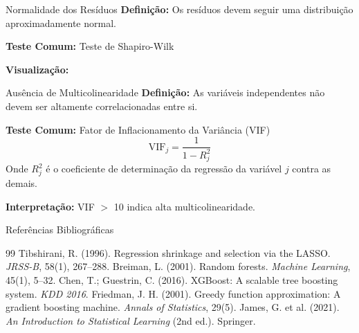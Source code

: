 \documentclass[]{beamer}
\begin{document}
\begin{frame}{Normalidade dos Resíduos}
    \textbf{Definição:}
    Os resíduos devem seguir uma distribuição aproximadamente normal.

    \vspace{0.5cm}
    \textbf{Teste Comum:} Teste de Shapiro-Wilk

    \vspace{0.5cm}
    \textbf{Visualização:}
\end{frame}


\begin{frame}{Ausência de Multicolinearidade}
    \textbf{Definição:}
    As variáveis independentes não devem ser altamente correlacionadas entre si.

    \vspace{0.5cm}
    \textbf{Teste Comum:} Fator de Inflacionamento da Variância (VIF)
    \begin{equation}
        \text{VIF}_j = \frac{1}{1 - R_j^2}
    \end{equation}
    Onde $R_j^2$ é o coeficiente de determinação da regressão da variável $j$ contra as demais.

    \vspace{0.5cm}
    \textbf{Interpretação:} VIF $>$ 10 indica alta multicolinearidade.
\end{frame}







\begin{frame}{Referências Bibliográficas}
\begin{thebibliography}{99}
\small
{} Tibshirani, R. (1996). Regression shrinkage and selection via the LASSO. \textit{JRSS-B}, 58(1), 267--288.
 Breiman, L. (2001). Random forests. \textit{Machine Learning}, 45(1), 5--32.
 Chen, T.; Guestrin, C. (2016). XGBoost: A scalable tree boosting system. \textit{KDD 2016}.
 Friedman, J. H. (2001). Greedy function approximation: A gradient boosting machine. \textit{Annals of Statistics}, 29(5).
 James, G. et al. (2021). \textit{An Introduction to Statistical Learning} (2nd ed.). Springer.
\end{thebibliography}
\end{frame}
\end{document}
